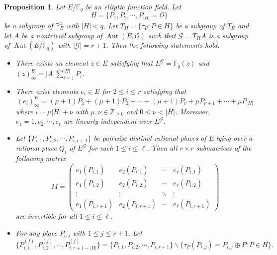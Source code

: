 \documentclass[journal,12pt,onecolumn]{IEEEtran}
\newtheorem{proposition}{Proposition}
\begin{document}
\begin{proposition}\label{find_e_i}
    Let \( E/\mathbb{F}_q \) be an elliptic function field. Let
    \[
        H = \big\{P_1,P_2,\cdots,P_{|H|} = \mathcal{O}\big\}
    \]
    be a subgroup of \( \mathbb{P}^1_E \) with \( |H|<q \). Let \( T_H = \{\tau_P:P\in H\} \) be a subgroup of \( T_E \) and let \( A \) be a nontrivial subgroup of \( \operatorname{Aut}(E, \mathcal{O}) \) such that \( \mathcal{G} = T_H A \) is a subgroup of \( \operatorname{Aut}(E/\mathbb{F}_q) \) with \( |\mathcal{G}| = r + 1\). Then the following statements hold.

    \begin{itemize}
        \item[(i)] There exists an element \( z \in E \) satisfying that \( E^{\mathcal{G}} = \mathbb{F}_q(z) \) and \( (z)^E_\infty = |A|\sum_{i = 1}^{|H|} P_i \).
        \item[(ii)] There exist elements \( e_i \in E \) for \( 2\le i\le r \) satisfying that 
        \begin{equation}\label{e_i_condition}
            (e_i)^{E}_\infty = (\mu + 1)P_1 + (\mu + 1)P_2 + \cdots + (\mu + 1)P_\nu + \mu P_{\nu + 1} + \cdots + \mu P_{|H|}
        \end{equation}
        where \( i = \mu |H| + \nu \) with \( \mu,\nu\in\mathbb{Z}_{\ge0} \) and \( 0\le \nu < |H| \). Moreover, \( e_1 = 1, e_2, \cdots, e_r \) are linearly independent over \( E^{\mathcal{G}} \).
        \item[(iii)] Let \(\{P_{i,1}, P_{i,2}, \cdots, P_{i,r+1}\}\) be pairwise distinct rational places of \( E \) lying over a rational place \( Q_i \) of \( E^{\mathcal{G}} \) for each \( 1 \leq i \leq \ell \). Then all \( r \times r \) submatrices of the following matrix
        \[
            M=\begin{pmatrix}
            e_1(P_{i,1}) & e_2(P_{i,1}) & \cdots & e_r(P_{i,1}) \\
            e_1(P_{i,2}) & e_2(P_{i,2}) & \cdots & e_r(P_{i,2}) \\
            \vdots & \vdots & \ddots & \vdots \\
            e_1(P_{i,r+1}) & e_2(P_{i,r+1}) & \cdots & e_r(P_{i,r+1})
            \end{pmatrix}
        \]
        are invertible for all $1\le i\le \ell$. 
        \item[(iv)] For any place \(P_{i,j}\) with \(1\le j \le r+1\). Let 
        \[
            \{P_{i,1}^{(j)},P_{i,2}^{(j)},\cdots,P_{i,r+1 - |H|}^{(j)}\} = \{P_{i,1}, P_{i,2}, \cdots, P_{i,r+1}\}\backslash\{\tau_P(P_{i,j}) = P_{i,j}\oplus P:P\in H\}. 
\]
\end{itemize}
\end{proposition}
\end{document}

